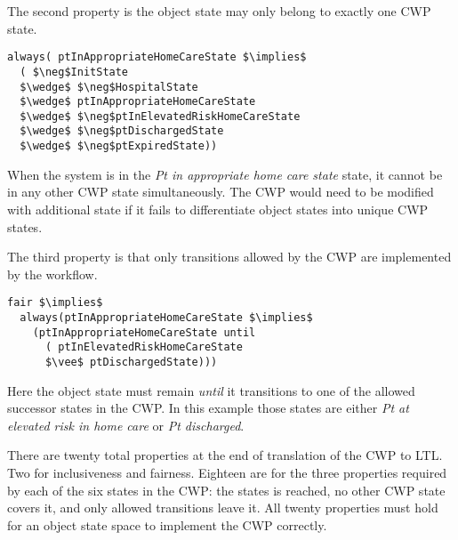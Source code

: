 The second property is the object state may only belong to exactly one CWP state.
%
{\small
\begin{lstlisting}[style=myPromela,mathescape=true]
always( ptInAppropriateHomeCareState $\implies$ 
  ( $\neg$InitState
  $\wedge$ $\neg$HospitalState 
  $\wedge$ ptInAppropriateHomeCareState 
  $\wedge$ $\neg$ptInElevatedRiskHomeCareState 
  $\wedge$ $\neg$ptDischargedState 
  $\wedge$ $\neg$ptExpiredState))
\end{lstlisting}
}
%
\noindent When the system is in the \emph{Pt in appropriate home care state} state, it cannot be in any other CWP state simultaneously.
The CWP would need to be modified with additional state if it fails to differentiate object states into unique CWP states.

The third property is that only transitions allowed by the CWP are implemented by the workflow.
%
{\small
\begin{lstlisting}[style=myPromela,mathescape=true]
fair $\implies$ 
  always(ptInAppropriateHomeCareState $\implies$ 
    (ptInAppropriateHomeCareState until
      ( ptInElevatedRiskHomeCareState
      $\vee$ ptDischargedState)))
\end{lstlisting}
}
%
\noindent Here the object state must remain \emph{until} it transitions to one of the allowed successor states in the CWP.
In this example those states are either \emph{Pt at elevated risk in home care} or \emph{Pt discharged}.

There are twenty total properties at the end of translation of the CWP to LTL.
Two for inclusiveness and fairness.
Eighteen are for the three properties required by each of the six states in the CWP: the states is reached, no other CWP state covers it, and only allowed transitions leave it.
All twenty properties must hold for an object state space to implement the CWP correctly.